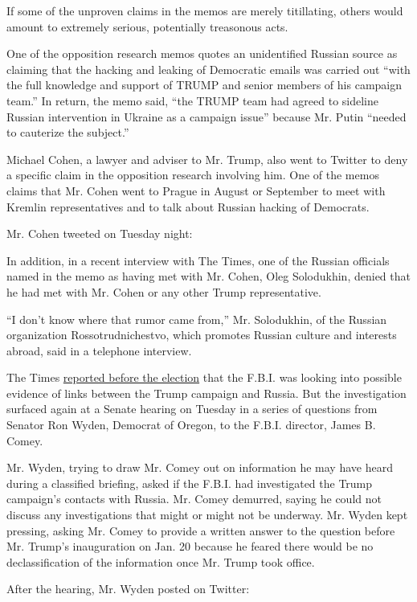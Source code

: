 If some of the unproven claims in the memos are merely titillating,
others would amount to extremely serious, potentially treasonous acts.

One of the opposition research memos quotes an unidentified Russian
source as claiming that the hacking and leaking of Democratic emails was
carried out ``with the full knowledge and support of TRUMP and senior
members of his campaign team.'' In return, the memo said, ``the TRUMP
team had agreed to sideline Russian intervention in Ukraine as a
campaign issue'' because Mr. Putin ``needed to cauterize the subject.''

Michael Cohen, a lawyer and adviser to Mr. Trump, also went to Twitter
to deny a specific claim in the opposition research involving him. One
of the memos claims that Mr. Cohen went to Prague in August or September
to meet with Kremlin representatives and to talk about Russian hacking
of Democrats.

Mr. Cohen tweeted on Tuesday night:

In addition, in a recent interview with The Times, one of the Russian
officials named in the memo as having met with Mr. Cohen, Oleg
Solodukhin, denied that he had met with Mr. Cohen or any other Trump
representative.

``I don't know where that rumor came from,'' Mr. Solodukhin, of the
Russian organization Rossotrudnichestvo, which promotes Russian culture
and interests abroad, said in a telephone interview.

The Times
\href{https://www.nytimes.com/2016/11/01/us/politics/fbi-russia-election-donald-trump.html}{reported
before the election} that the F.B.I. was looking into possible evidence
of links between the Trump campaign and Russia. But the investigation
surfaced again at a Senate hearing on Tuesday in a series of questions
from Senator Ron Wyden, Democrat of Oregon, to the F.B.I. director,
James B. Comey.

Mr. Wyden, trying to draw Mr. Comey out on information he may have heard
during a classified briefing, asked if the F.B.I. had investigated the
Trump campaign's contacts with Russia. Mr. Comey demurred, saying he
could not discuss any investigations that might or might not be
underway. Mr. Wyden kept pressing, asking Mr. Comey to provide a written
answer to the question before Mr. Trump's inauguration on Jan. 20
because he feared there would be no declassification of the information
once Mr. Trump took office.

After the hearing, Mr. Wyden posted on Twitter:

